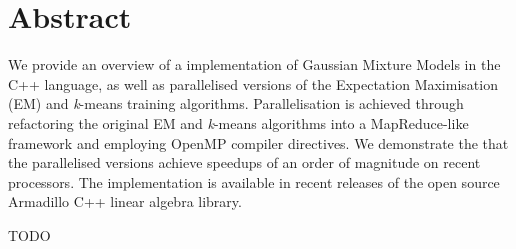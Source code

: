 \section*{Abstract}

We provide an overview of a implementation of Gaussian Mixture Models in the C++ language,
as well as parallelised versions of the Expectation Maximisation (EM) and {\it k}-means training algorithms.
Parallelisation is achieved through refactoring the original EM and {\it k}-means algorithms into a MapReduce-like framework
and employing OpenMP compiler directives.
We demonstrate the that the parallelised versions achieve speedups of an order of magnitude on recent processors.
The implementation is available in recent releases of the open source Armadillo C++ linear algebra library.

TODO

